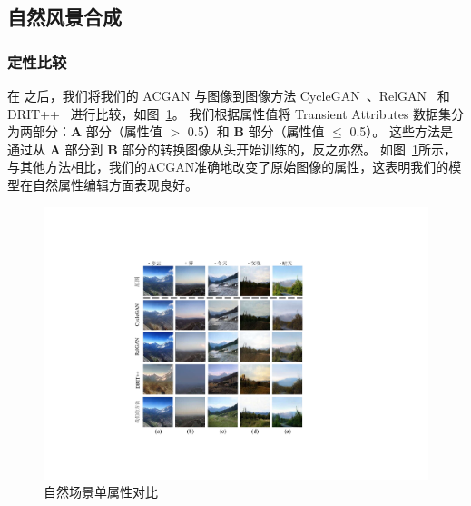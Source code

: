 \subsection{自然风景合成}

\subsubsection{定性比较}
在 \cite{iclr2021} 之后，我们将我们的 ACGAN 与图像到图像方法 CycleGAN~\cite{cyclegan}、RelGAN~\cite{relgan} 和 DRIT++~\cite{drit++} 进行比较，如图~\ref{fig:sceneComparison}。 我们根据属性值将 Transient Attributes 数据集分为两部分：\textbf{A} 部分（属性值 $>$ 0.5）和 \textbf{B} 部分（属性值 $\leq$ 0.5）。 这些方法是通过从 \textbf{A} 部分到 \textbf{B} 部分的转换图像从头开始训练的，反之亦然。
如图~\ref{fig:sceneComparison}所示，与其他方法相比，我们的ACGAN准确地改变了原始图像的属性，这表明我们的模型在自然属性编辑方面表现良好。

\begin{figure}[t]
    \begin{center}
         \includegraphics[width=0.7\linewidth]{figures/ACGAN/Scenecomparison.pdf}
    \end{center}
    \caption{自然场景单属性对比}
    \label{fig:sceneComparison}
\end{figure}

